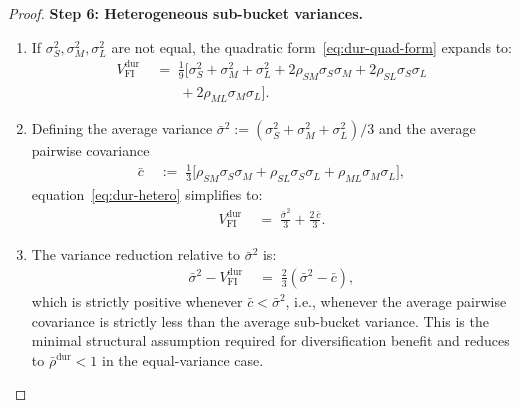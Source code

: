 \documentclass[12pt,openany]{book}
\numberwithin{equation}{chapter}
\theoremstyle{plain}
\theoremstyle{definition}
\theoremstyle{remark}
\begin{document}
\begin{proof}
\medskip
\noindent\textbf{Step 6: Heterogeneous sub-bucket variances.}

\begin{enumerate}
  \item If $\sigma_S^2, \sigma_M^2, \sigma_L^2$ are not equal,
        the quadratic form~\eqref{eq:dur-quad-form} expands to:
        \begin{align}
          V_{\mathrm{FI}}^{\mathrm{dur}}
          &\;=\; \frac{1}{9}
                 \bigl[
                   \sigma_S^2 + \sigma_M^2 + \sigma_L^2
                   + 2\rho_{SM}\sigma_S\sigma_M
                   + 2\rho_{SL}\sigma_S\sigma_L
          \nonumber\\
          &\qquad
                   + 2\rho_{ML}\sigma_M\sigma_L
                 \bigr].
          \label{eq:dur-hetero}
        \end{align}
  \item Defining the average variance
        $\bar{\sigma}^2 := (\sigma_S^2+\sigma_M^2+\sigma_L^2)/3$
        and the average pairwise covariance
        \begin{align}
          \bar{c}
          &\;:=\; \frac{1}{3}\bigl[
                    \rho_{SM}\sigma_S\sigma_M
                    + \rho_{SL}\sigma_S\sigma_L
                    + \rho_{ML}\sigma_M\sigma_L
                  \bigr],
          \label{eq:dur-cbar}
        \end{align}
        equation~\eqref{eq:dur-hetero} simplifies to:
        \begin{align}
          V_{\mathrm{FI}}^{\mathrm{dur}}
          &\;=\; \frac{\bar{\sigma}^2}{3}
                 + \frac{2\,\bar{c}}{3}.
          \label{eq:dur-hetero-compact}
        \end{align}
  \item The variance reduction relative to $\bar{\sigma}^2$ is:
        \begin{align}
          \bar{\sigma}^2 - V_{\mathrm{FI}}^{\mathrm{dur}}
          &\;=\; \frac{2}{3}(\bar{\sigma}^2 - \bar{c}),
          \label{eq:dur-hetero-reduction}
        \end{align}
        which is strictly positive whenever
        $\bar{c} < \bar{\sigma}^2$, i.e., whenever the average
        pairwise covariance is strictly less than the average
        sub-bucket variance.  This is the minimal structural
        assumption required for diversification benefit and reduces
        to $\bar{\rho}^{\mathrm{dur}} < 1$ in the equal-variance
        case.
\end{enumerate}


\end{proof}
\end{document}
